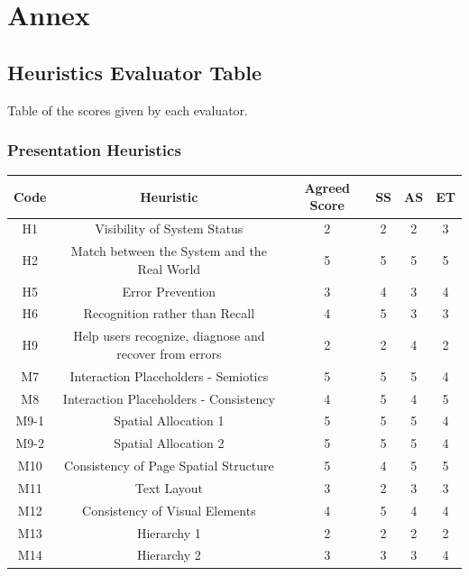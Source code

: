 \documentclass[11pt]{article} %
\begin{document}
\newpage

\section{Annex}
\subsection{Heuristics Evaluator Table}
Table of the scores given by each evaluator.
\subsubsection{Presentation Heuristics}
\begin{center}
    \begin{tabular}{|c|c|c|c|c|c|}
        \hline
        \textbf{Code}  & \textbf{Heuristic} & \textbf{Agreed Score} & \textbf{SS} & \textbf{AS} & \textbf{ET} \\
        \hline
        H1 & Visibility of System Status & 2 & 2 & 2 & 3 \\
        \hline
        H2 & Match between the System and the Real World & 5 & 5 & 5 & 5 \\
        \hline
        H5 & Error Prevention & 3 & 4 & 3 & 4 \\
        \hline
        H6 & Recognition rather than Recall & 4 & 5 & 3 & 3 \\
        \hline
        H9 & Help users recognize, diagnose and recover from errors & 2 & 2 & 4 & 2 \\
        \hline
        M7 & Interaction Placeholders - Semiotics & 5 & 5 & 5 & 4 \\
        \hline
        M8 & Interaction Placeholders - Consistency & 4 & 5 & 4 & 5 \\
        \hline
        M9-1 & Spatial Allocation 1 & 5 & 5 & 5 & 4 \\
        \hline
        M9-2 & Spatial Allocation 2 & 5 & 5 & 5 & 4 \\
        \hline
        M10 & Consistency of Page Spatial Structure & 5 & 4 & 5 & 5 \\
        \hline
        M11 & Text Layout & 3 & 2 & 3 & 3 \\
        \hline
        M12 & Consistency of Visual Elements & 4 & 5 & 4 & 4 \\
        \hline
        M13 & Hierarchy 1 & 2 & 2 & 2 & 2 \\
        \hline
        M14 & Hierarchy 2 & 3 & 3 & 3 & 4 \\
        \hline
\end{tabular}
\end{center}
\end{document}
